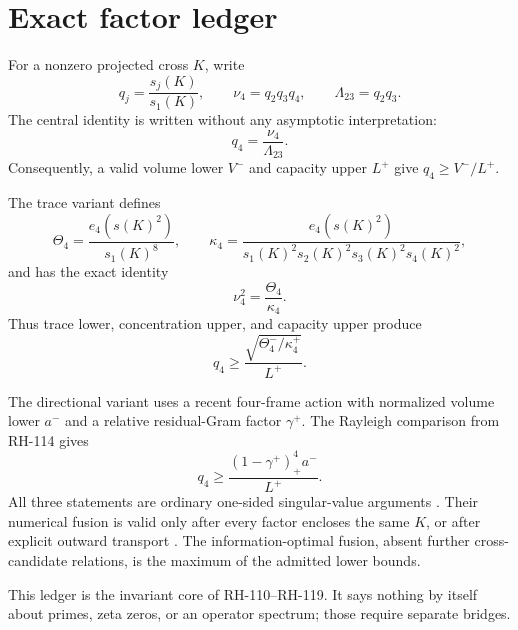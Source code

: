 \documentclass[12pt]{article}
\begin{document}
\section{Exact factor ledger}
For a nonzero projected cross $K$, write
\[
 q_j=\frac{s_j(K)}{s_1(K)},\qquad
 \nu_4=q_2q_3q_4,\qquad
 \Lambda_{23}=q_2q_3.
\]
The central identity is written without any asymptotic interpretation:
\begin{equation}\label{eq:core}
q_4=\frac{\nu_4}{\Lambda_{23}}.
\end{equation}
Consequently, a valid volume lower $V^-$ and capacity upper $L^+$ give
$q_4\geq V^-/L^+$.

The trace variant defines
\[
 \Theta_4=\frac{e_4(s(K)^2)}{s_1(K)^8},\qquad
 \kappa_4=
 \frac{e_4(s(K)^2)}{s_1(K)^2s_2(K)^2s_3(K)^2s_4(K)^2},
\]
and has the exact identity
\begin{equation}\label{eq:trace}
 \nu_4^2=\frac{\Theta_4}{\kappa_4}.
\end{equation}
Thus trace lower, concentration upper, and capacity upper produce
\[
 q_4\geq \frac{\sqrt{\Theta_4^-/\kappa_4^+}}{L^+}.
\]

The directional variant uses a recent four-frame action with normalized
volume lower $a^-$ and a relative residual-Gram factor $\gamma^+$.  The
Rayleigh comparison from RH-114 gives
\[
 q_4\geq\frac{(1-\gamma^+)_+^4a^-}{L^+}.
\]
All three statements are ordinary one-sided singular-value arguments
\citep{HornJohnson1991}.  Their numerical fusion is valid only after every
factor encloses the same $K$, or after explicit outward transport
\citep{Moore1966}.  The information-optimal fusion, absent further
cross-candidate relations, is the maximum of the admitted lower bounds.

This ledger is the invariant core of RH-110--RH-119.  It says nothing by
itself about primes, zeta zeros, or an operator spectrum; those require
separate bridges.
\end{document}
